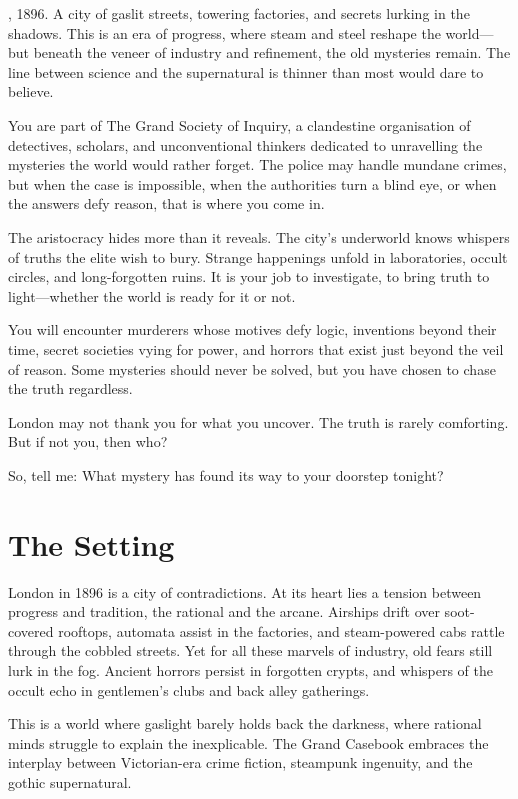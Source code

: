
\begin{WyrdSettingHeading}
    , 1896. A city of gaslit streets, towering factories, and secrets lurking in the shadows. This is an era of progress, where steam and steel reshape the world—but beneath the veneer of industry and refinement, the old mysteries remain. The line between science and the supernatural is thinner than most would dare to believe.

    \raggedright
    You are part of The Grand Society of Inquiry, a clandestine organisation of detectives, scholars, and unconventional thinkers dedicated to unravelling the mysteries the world would rather forget. The police may handle mundane crimes, but when the case is impossible, when the authorities turn a blind eye, or when the answers defy reason, that is where you come in.

    The aristocracy hides more than it reveals. The city's underworld knows whispers of truths the elite wish to bury. Strange happenings unfold in laboratories, occult circles, and long-forgotten ruins. It is your job to investigate, to bring truth to light—whether the world is ready for it or not.

    You will encounter murderers whose motives defy logic, inventions beyond their time, secret societies vying for power, and horrors that exist just beyond the veil of reason. Some mysteries should never be solved, but you have chosen to chase the truth regardless.

    London may not thank you for what you uncover. The truth is rarely comforting. But if not you, then who?

    So, tell me: What mystery has found its way to your doorstep tonight?
\end{WyrdSettingHeading}

\section{The Setting}

London in 1896 is a city of contradictions. At its heart lies a tension between progress and tradition, the rational and the arcane. Airships drift over soot-covered rooftops, automata assist in the factories, and steam-powered cabs rattle through the cobbled streets. Yet for all these marvels of industry, old fears still lurk in the fog. Ancient horrors persist in forgotten crypts, and whispers of the occult echo in gentlemen’s clubs and back alley gatherings.

This is a world where gaslight barely holds back the darkness, where rational minds struggle to explain the inexplicable. The Grand Casebook embraces the interplay between Victorian-era crime fiction, steampunk ingenuity, and the gothic supernatural.

